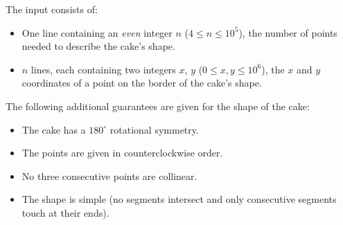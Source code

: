 
    The input consists of:
    \begin{itemize}
        \item One line containing an \emph{even} integer $n$ ($4 \leq n\leq 10^5$), the number of points needed to describe the cake's shape.
        \item $n$ lines, each containing two integers $x$, $y$ ($0\leq x,y \leq 10^6$), the $x$ and $y$ coordinates of a point on the border of the cake's shape.
    \end{itemize}
    The following additional guarantees are given for the shape of the cake:
    \begin{itemize}
    	\item The cake has a $180^\circ$ rotational symmetry.
    	\item The points are given in counterclockwise order.
    	\item No three consecutive points are collinear.
    	\item The shape is simple (no segments intersect and only consecutive segments touch at their ends).
    \end{itemize}


\newpage
